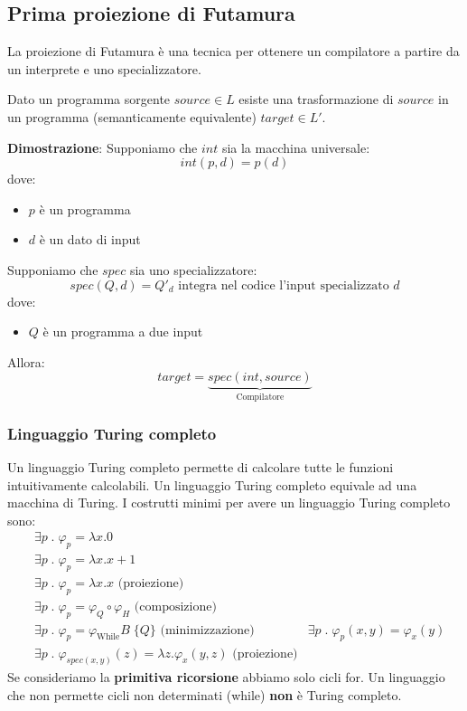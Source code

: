 \documentclass[a4paper]{article}
\begin{document}
\subsection{Prima proiezione di Futamura}
La proiezione di Futamura è una tecnica per ottenere un compilatore a partire
da un interprete e uno specializzatore.

\begin{definition}
  Dato un programma sorgente \( source \in L \) esiste una trasformazione di
  \( source \) in un programma (semanticamente equivalente) \( target \in L' \).

  \vspace{1em}
  \noindent
  \textbf{Dimostrazione}: Supponiamo che \( int \) sia la macchina universale:
  \[
    int(p, d) = p(d)
  \] 
  dove:
  \begin{itemize}
    \item \( p \) è un programma
    \item \( d \) è un dato di input
  \end{itemize}
  Supponiamo che \( spec \) sia uno specializzatore:
  \[
    spec(Q, d) = Q'_d \text{ integra nel codice l'input specializzato } d
  \] 
  dove:
  \begin{itemize}
    \item \( Q \) è un programma a due input
  \end{itemize}
  Allora:
  \[
    target = \underbrace{spec(int, source)}_{\text{Compilatore}}
  \] 
\end{definition}

\subsubsection{Linguaggio Turing completo}
Un linguaggio Turing completo permette di calcolare tutte le funzioni intuitivamente calcolabili.
Un linguaggio Turing completo equivale ad una macchina di Turing. I costrutti 
minimi per avere un linguaggio Turing completo sono:
\[
  \begin{aligned}
    &\exists p \;.\; \varphi_p = \lambda x . 0\\
    &\exists p \;.\; \varphi_p = \lambda x . x + 1\\
    &\exists p \;.\; \varphi_p = \lambda x . x \text{ (proiezione)}\\
    &\exists p \;.\; \varphi_p = \varphi_Q \circ \varphi_H \text{ (composizione)}\\
    &\exists p \;.\; \varphi_p = \varphi_{\text{While}} B \; \{Q\} \text{ (minimizzazione)}
    &\exists p \;.\; \varphi_p(x,y) = \varphi_x(y)\\
    &\exists p \;.\; \varphi_{spec(x,y)}(z) = \lambda z . \varphi_x(y,z) \text{ (proiezione)}
  \end{aligned}
\] 
Se consideriamo la \textbf{primitiva ricorsione} abbiamo solo cicli for. Un linguaggio che non
permette cicli non determinati (while) \textbf{non} è Turing completo.
\end{document}
